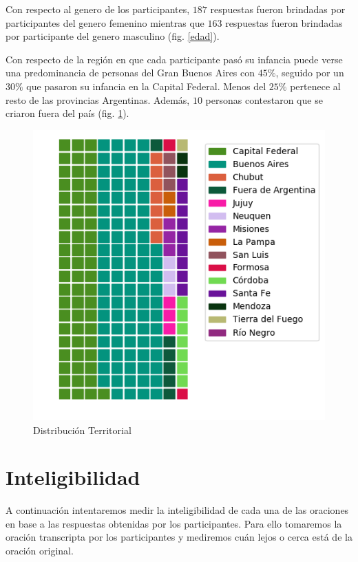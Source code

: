 Con respecto al genero de los participantes, $187$ respuestas fueron brindadas por participantes del genero femenino mientras que $163$ respuestas fueron brindadas por participante del genero masculino (fig. \ref{edad}).

Con respecto de la región en que cada participante pasó su infancia puede verse una predominancia de personas del Gran Buenos Aires con $45\%$, seguido por un $30\%$ que pasaron su infancia en la Capital Federal. Menos del $25\%$ pertenece al resto de las provincias Argentinas. Además, $10$ personas contestaron que se criaron fuera del país (fig. \ref{distTerritorial}).

\begin{figure}
\begin{center}
\includegraphics[scale=0.8]{datosDemograficos/infancia.png}
\end{center}
\caption{Distribución Territorial}
\label{distTerritorial}
\end{figure}

\section{Inteligibilidad}\label{SeccionInteligibilidad}

A continuación intentaremos medir la inteligibilidad de cada una de las oraciones en base a las respuestas obtenidas por los participantes. Para ello tomaremos la oración transcripta por los participantes y mediremos cuán lejos o cerca está de la oración original. 


